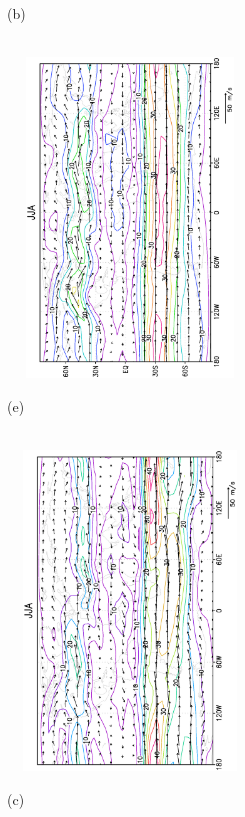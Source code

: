 \documentclass[12pt,a4paper,twoside,openright,headinclude,liststotoc,bibtotoc]{scrreprt}
\begin{document}
\begin{figure}[H]
{}
\parbox{8.5cm}{\hspace{0.50cm}\begin{scriptsize}(b)\end{scriptsize} \vspace{-0.7cm} \\
\includegraphics[height=8.5cm,width=6.5cm,angle=-90]
{eps/uv300JJA.eps}
}
\parbox{8.5cm}{\hspace{0.25cm}\begin{scriptsize}(e)\end{scriptsize} \vspace{-0.7cm} \\
\includegraphics[height=8.5cm,width=6.5cm,angle=-90]
{eps/t21uv300JJA.eps}
}
\parbox{8.5cm}{\hspace{0.50cm}\begin{scriptsize}(c)\end{scriptsize} \vspace{-0.7cm} \\
}
\end{figure}
\end{document}
